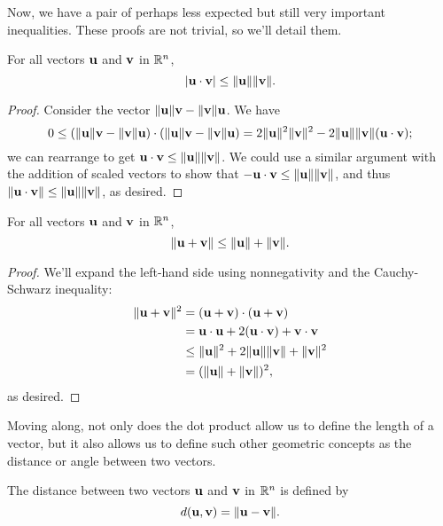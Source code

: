 \documentclass[../m073main.tex]{subfiles}
\begin{document}
Now, we have a pair of perhaps less expected but still very important inequalities.
These proofs are not trivial, so we'll detail them.

\begin{theorem}
	For all vectors $\mathbf{u}$ and $\mathbf{v}$ in $\mathbb{R}^n$,
	\[ |\mathbf{u} \cdot \mathbf{v}| \leq \|\mathbf{u}\| \|\mathbf{v}\|. \]
\end{theorem}

\begin{proof}
	Consider the vector $\| \mathbf{u} \| \mathbf{v} - \| \mathbf{v} \| \mathbf{u}$.
	We have
	\[ 0 \leq (\| \mathbf{u} \| \mathbf{v} - \| \mathbf{v} \| \mathbf{u}) \cdot (\| \mathbf{u} \| \mathbf{v} - \| \mathbf{v} \| \mathbf{u}) = 2 \| \mathbf{u} \|^2 \| \mathbf{v} \|^2 - 2 \| \mathbf{u} \| \| \mathbf{v} \| (\mathbf{u} \cdot \mathbf{v}); \]
	we can rearrange to get $\mathbf{u} \cdot \mathbf{v} \leq \| \mathbf{u} \|  \| \mathbf{v} \|$.
	We could use a similar argument with the addition of scaled vectors to show that $-\mathbf{u} \cdot \mathbf{v} \leq \| \mathbf{u} \|  \| \mathbf{v} \|$, and thus $\| \mathbf{u} \cdot \mathbf{v} \| \leq \| \mathbf{u} \|  \| \mathbf{v} \|$, as desired.
\end{proof}

\begin{theorem}
	For all vectors $\mathbf{u}$ and $\mathbf{v}$ in $\mathbb{R}^n$,
	\[ \|\mathbf{u} + \mathbf{v}\| \leq \|\mathbf{u}\| + \|\mathbf{v}\|. \]
\end{theorem}

\begin{proof}
	We'll expand the left-hand side using nonnegativity and the Cauchy-Schwarz inequality:
	\begin{align*}
		\| \mathbf{u} + \mathbf{v} \|^2 &= (\mathbf{u} + \mathbf{v}) \cdot (\mathbf{u} + \mathbf{v}) \\
		&= \mathbf{u} \cdot \mathbf{u} + 2(\mathbf{u} \cdot \mathbf{v}) + \mathbf{v} \cdot \mathbf{v} \\
		&\leq \| \mathbf{u} \|^2 + 2 \| \mathbf{u} \|  \| \mathbf{v} \| + \| \mathbf{v} \|^2 \\
		&= (\| \mathbf{u} \| + \| \mathbf{v} \|)^2,
	\end{align*}
	as desired.
\end{proof}

Moving along, not only does the dot product allow us to define the length of a vector, but it also allows us to define such other geometric concepts as the distance or angle between two vectors.

\begin{definition}[Distance]
	The distance between two vectors $\mathbf{u}$ and $\mathbf{v}$ in $\mathbb{R}^n$ is defined by
	\[ d(\mathbf{u}, \mathbf{v}) = \|\mathbf{u} - \mathbf{v}\|. \]
\end{definition}
\end{document}
